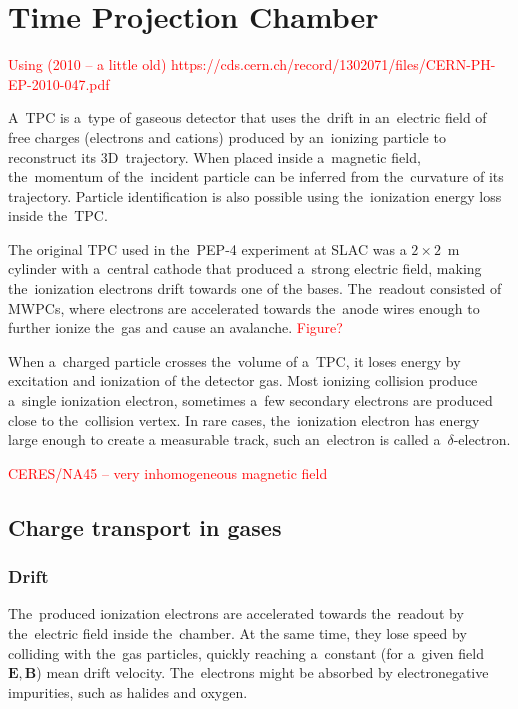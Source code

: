 \chapter{Time Projection Chamber}
\label{sec:tpc}
	\textcolor{red}{Using (2010 -- a little old) https://cds.cern.ch/record/1302071/files/CERN-PH-EP-2010-047.pdf}
	
	A~\acf{TPC} is a~type of gaseous detector that uses the~drift in an~electric field of free charges (electrons and cations) produced by an~ionizing particle to reconstruct its 3D~trajectory. When placed inside a~magnetic field, the~momentum of the~incident particle can be inferred from the~curvature of its trajectory. Particle identification is also possible using the~ionization energy loss inside the~\ac{TPC}.
	
	The original \ac{TPC} used in the~PEP-4 experiment at SLAC was a $2\times2$~m cylinder with a~central cathode that produced a~strong electric field, making the~ionization electrons drift towards one of the bases. The~readout consisted of \ac{MWPC}s, where electrons are accelerated towards the~anode wires enough to further ionize the~gas and cause an avalanche. \textcolor{red}{Figure?}
	
	When a~charged particle crosses the~volume of a~\ac{TPC}, it loses energy by excitation and ionization of the detector gas. Most ionizing collision produce a~single ionization electron, sometimes a~few secondary electrons are produced close to the~collision vertex. In rare cases, the~ionization electron has energy large enough to create a measurable track, such an~electron is called a~$\delta$\nobreakdash-electron.
	
	\textcolor{red}{CERES/NA45 -- very inhomogeneous magnetic field}
	
	\section{Charge transport in gases}
		\subsection{Drift}
			The~produced ionization electrons are accelerated towards the~readout by the~electric field inside the~chamber. At the same time, they lose speed by colliding with the~gas particles, quickly reaching a~constant (for a~given field $\mathbf{E}, \mathbf{B}$) mean drift velocity. The~electrons might be absorbed by electronegative impurities, such as halides and oxygen.
			
